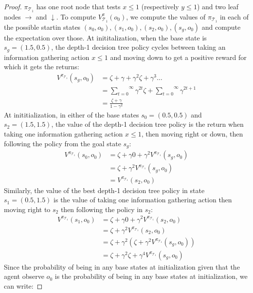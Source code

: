 \begin{proof} $\pi_{\mathcal{T}_1}$ has one root node that tests $x\leq1$ (respectively $y\leq1$) and two leaf nodes $\rightarrow$ and $\downarrow$. 
To compute $V^\pi_{\mathcal{T}_1}(o_0)$, we compute the values of $\pi_{\mathcal{T}_1}$ in each of the possible startin states $(s_0, o_0), (s_1, o_0), (s_2, o_0), (s_g, o_0)$ and compute the expectation over those. 
At inititalization, when the base state is $s_g = (1.5, 0.5)$, the depth-1 decision tree policy cycles between taking an information gathering action $x\leq1$ and moving down to get a positive reward for which it gets the returns:
\begin{align*}
    V^{\pi_{\mathcal{T}_1}} (s_g, o_0) &= \zeta + \gamma + \gamma^2 \zeta + \gamma^3 \dots \\
    &= \overset{\infty}{\underset{t=0}\sum} \gamma^{2t} \zeta + \overset{\infty}{\underset{t=0}\sum} \gamma^{2t+1} \\
    &= \frac{\zeta + \gamma}{1 - \gamma^2}
\end{align*}
At inititialization, in either of the base states $s_0=(0.5,0.5)$ and $s_2=(1.5, 1.5)$, the value of the depth-1 decision tree policy is the return when taking one information gathering action $x\leq1$, then moving right or down, then following the policy from the goal state $s_g$:
\begin{align*}
    V^{\pi_{\mathcal{T}_1}} (s_0, o_0) &= \zeta + \gamma 0 + \gamma^2 V^{\pi_{\mathcal{T}_1}} (s_g, o_0) \\
    &= \zeta + \gamma^2 V^{\pi_{\mathcal{T}_1}} (s_g, o_0) \\
    &= V^{\pi_{\mathcal{T}_1}} (s_2, o_0)
\end{align*}
Similarly, the value of the best depth-1 decision tree policy in state $s_1=(0.5,1.5)$ is the value of taking one information gathering action then moving right to $s_2$ then following the policy in $s_2$:
\begin{align*}
    V^{\pi_{\mathcal{T}_1}} (s_1, o_0) &= \zeta + \gamma 0 + \gamma^2 V^{\pi_{\mathcal{T}_1}} (s_2, o_0) \\
    &= \zeta + \gamma^2 V^{\pi_{\mathcal{T}_1}} (s_2, o_0) \\
    &= \zeta + \gamma^2 (\zeta + \gamma^2 V^{\pi_{\mathcal{T}_1}} (s_g, o_0)) \\
    &= \zeta + \gamma^2 \zeta + \gamma^4 V^{\pi_{\mathcal{T}_1}} (s_g, o_0)
\end{align*}
Since the probability of being in any base states at initialization given that the agent observe $o_0$ is the probability of being in any base states at initialization, we can write:

\end{proof}
